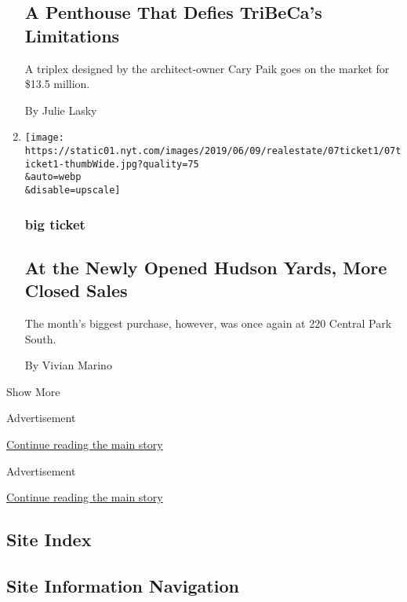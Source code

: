 \begin{enumerate}
  \hypertarget{a-penthouse-that-defies-tribecas-limitations}{%
  \subsection{A Penthouse That Defies TriBeCa's
  Limitations}\label{a-penthouse-that-defies-tribecas-limitations}}

  A triplex designed by the architect-owner Cary Paik goes on the market
  for \$13.5 million.

  By Julie Lasky
\item
  \href{/2019/06/07/realestate/at-the-newly-opened-hudson-yards-more-closed-sales.html}{}

  \texttt{[image: https://static01.nyt.com/images/2019/06/09/realestate/07ticket1/07ticket1-thumbWide.jpg?quality=75\\\&auto=webp\\\&disable=upscale]}

  \hypertarget{big-ticket-2}{%
  \subsubsection{big ticket}\label{big-ticket-2}}

  \hypertarget{at-the-newly-opened-hudson-yards-more-closed-sales}{%
  \subsection{At the Newly Opened Hudson Yards, More Closed
  Sales}\label{at-the-newly-opened-hudson-yards-more-closed-sales}}

  The month's biggest purchase, however, was once again at 220 Central
  Park South.

  By Vivian Marino
\end{enumerate}

Show More

Advertisement

\protect\hyperlink{after-mid2}{Continue reading the main story}

Advertisement

\protect\hyperlink{after-mktg}{Continue reading the main story}

\hypertarget{site-index}{%
\subsection{Site Index}\label{site-index}}

\hypertarget{site-information-navigation}{%
\subsection{Site Information
Navigation}\label{site-information-navigation}}

